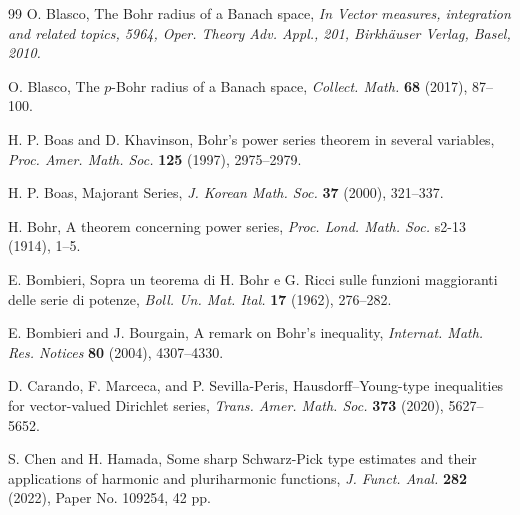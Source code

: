 \documentclass[a4paper,11pt, reqno]{amsart}
\theoremstyle{definition}
\begin{document}
\begin{thebibliography}{99}
		 {\sc O. Blasco}, The Bohr radius of a Banach space, {\it In Vector measures, integration and related topics, 5964, Oper. Theory Adv. Appl., 201, Birkh{\"a}user Verlag, Basel, 2010.}
	
	 {\sc O. Blasco}, The $p$-Bohr radius of a Banach space, {\it Collect. Math.} {\bf 68} (2017), 87--100.
	
	
	 {\sc H. P. Boas} and {\sc D. Khavinson}, Bohr's power series theorem in several variables, {\it Proc. Amer. Math. Soc.}  {\bf 125} (1997), 2975--2979.
	
	 {\sc H. P. Boas}, Majorant Series,  {\it J. Korean Math. Soc.}  {\bf 37} (2000), 321--337.
	
	 {\sc H. Bohr}, A theorem concerning power series,  {\it Proc. Lond. Math. Soc.} s2-13 (1914), 1--5.
	
	 {\sc E. Bombieri}, Sopra un teorema di H. Bohr e G. Ricci sulle funzioni maggioranti delle serie di potenze, {\it Boll. Un. Mat. Ital.} {\bf 17} (1962), 276--282.
	
	 {\sc E. Bombieri} and {\sc J. Bourgain}, A remark on Bohr's inequality, {\it Internat. Math. Res. Notices} {\bf 80} (2004), 4307--4330.
	
	
	
	 {\sc D. Carando, F. Marceca}, and {\sc P. Sevilla-Peris}, Hausdorff–Young-type inequalities for vector-valued Dirichlet series, {\it Trans. Amer. Math. Soc.} {\bf 373} (2020), 5627--5652.
	
	
	 {\sc S. Chen} and {\sc H. Hamada},  Some sharp Schwarz-Pick type estimates and their applications of harmonic and pluriharmonic functions, {\it J. Funct. Anal.} {\bf 282} (2022), Paper No. 109254, 42 pp.
	

\end{thebibliography}
\end{document}
